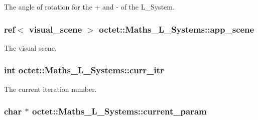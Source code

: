 The angle of rotation for the + and -\/ of the L\+\_\+\+System. 

\hypertarget{classoctet_1_1_maths___l___systems_aca3393864ce7f6347a7d45eac2f21950}{
\subsubsection[{app\+\_\+scene}]{\setlength{\rightskip}{0pt plus 5cm}ref$<$ visual\+\_\+scene $>$ octet\+::\+Maths\+\_\+\+L\+\_\+\+Systems\+::app\+\_\+scene\hspace{0.3cm}{\ttfamily [private]}}}\label{classoctet_1_1_maths___l___systems_aca3393864ce7f6347a7d45eac2f21950}


The visual scene. 

\hypertarget{classoctet_1_1_maths___l___systems_a320a9278ae12e7bed6714027ea64a334}{
\subsubsection[{curr\+\_\+itr}]{\setlength{\rightskip}{0pt plus 5cm}int octet\+::\+Maths\+\_\+\+L\+\_\+\+Systems\+::curr\+\_\+itr\hspace{0.3cm}{\ttfamily [private]}}}\label{classoctet_1_1_maths___l___systems_a320a9278ae12e7bed6714027ea64a334}


The current iteration number. 

\hypertarget{classoctet_1_1_maths___l___systems_a49d998a086a775f7ae692be076e5175d}{
\subsubsection[{current\+\_\+param}]{\setlength{\rightskip}{0pt plus 5cm}char $\ast$ octet\+::\+Maths\+\_\+\+L\+\_\+\+Systems\+::current\+\_\+param\hspace{0.3cm}{\ttfamily [private]}}}\label{classoctet_1_1_maths___l___systems_a49d998a086a775f7ae692be076e5175d}


